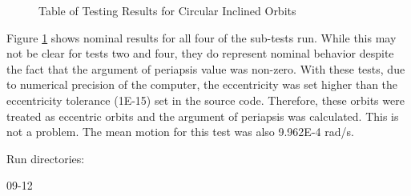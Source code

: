 \begin{description}
\begin{figure}[h]
\begin{center}
\caption{Table of Testing Results for Circular Inclined Orbits}
\label{cir_eq_45}
\end{center}
\end{figure}
Figure \ref{cir_eq_45} shows nominal results for all four of the sub-tests run.
While this may not be clear for tests two and four, they do represent nominal
behavior despite the fact that the argument of periapsis value was non-zero.
With these tests, due to numerical precision of the computer, the eccentricity
was set higher than the eccentricity tolerance (1E-15) set in the source code.
Therefore, these orbits were treated as eccentric orbits and the argument of
periapsis was calculated.  This is not a problem.  The mean motion for this
test was also 9.962E-4 rad/s.

Run directories:

09-12

\end{description}

